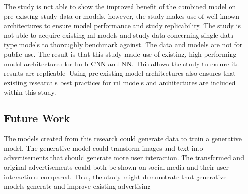 \documentclass[mksc,blindrev]{informs3} %
\begin{document}
The study is not able to show the improved benefit of the combined model on pre-existing study data or models, however, the study makes use of well-known architectures to ensure model performance and study replicability. The study is not able to acquire existing ml models and study data concerning single-data type models to thoroughly benchmark against. The data and models are not for public use. The result is that this study made use of existing, high-performing model architectures for both CNN and NN. This allows the study to ensure its results are replicable. Using pre-existing model architectures also ensures that existing research’s best practices for ml models and architectures are included within this study.

\subsection{Future Work}

The models created from this research could generate data to train a generative model. The generative model could transform images and text into advertisements that should generate more user interaction. The transformed and original advertisements could both be shown on social media and their user interactions compared. Thus, the study might demonstrate that generative models generate and  improve existing advertising






%
%
%



\end{document}
